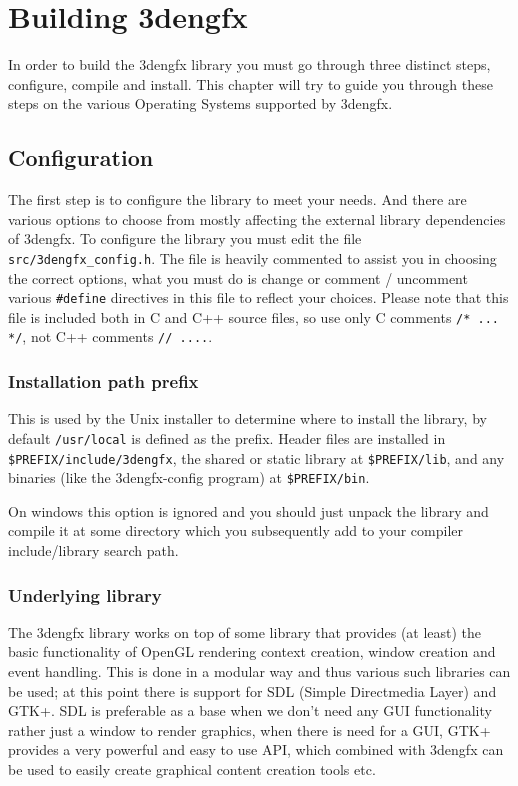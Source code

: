 \chapter{Building 3dengfx}

In order to build the 3dengfx library you must go through three distinct steps,
configure, compile and install. This chapter will try to guide you through these
steps on the various Operating Systems supported by 3dengfx.

\section{Configuration}

The first step is to configure the library to meet your needs. And there are
various options to choose from mostly affecting the external library
dependencies of 3dengfx. To configure the library you must edit the file
\verb|src/3dengfx_config.h|. The file is heavily commented to assist you in
choosing the correct options, what you must do is change or comment / uncomment
various \verb|#define| directives in this file to reflect your choices. Please
note that this file is included both in C and C++ source files, so use only C
comments \verb|/* ... */|, not C++ comments \verb|// ....|.

\subsection{Installation path prefix}

This is used by the Unix installer to determine where to install the library, by
default \verb|/usr/local| is defined as the prefix. Header files are installed
in \verb|$PREFIX/include/3dengfx|, the shared or static library at
\verb|$PREFIX/lib|, and any binaries (like the 3dengfx-config program) at
\verb|$PREFIX/bin|.

On windows this option is ignored and you should just unpack the library and
compile it at some directory which you subsequently add to your compiler
include/library search path.

\subsection{Underlying library}

The 3dengfx library works on top of some library that provides (at least) the
basic functionality of OpenGL rendering context creation, window creation and
event handling. This is done in a modular way and thus various such libraries
can be used; at this point there is support for SDL (Simple Directmedia Layer)
and GTK+. SDL is preferable as a base when we don't need any GUI functionality
rather just a window to render graphics, when there is need for a GUI, GTK+
provides a very powerful and easy to use API, which combined with 3dengfx can be
used to easily create graphical content creation tools etc.

